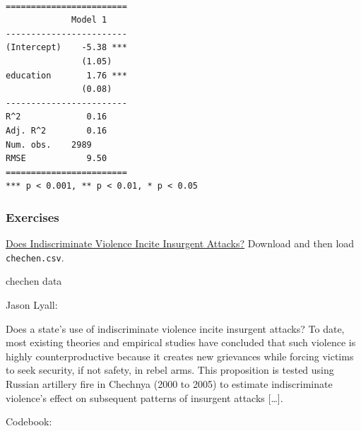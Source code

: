 \documentclass[]{article}
\theoremstyle{definition}
\theoremstyle{definition}
\theoremstyle{definition}
\theoremstyle{remark}
\begin{document}
\begin{verbatim}

========================
             Model 1    
------------------------
(Intercept)    -5.38 ***
               (1.05)   
education       1.76 ***
               (0.08)   
------------------------
R^2             0.16    
Adj. R^2        0.16    
Num. obs.    2989       
RMSE            9.50    
========================
*** p < 0.001, ** p < 0.01, * p < 0.05
\end{verbatim}

\subsubsection{Exercises}\label{exercises-8}

\href{http://journals.sagepub.com/doi/suppl/10.1177/0022002708330881}{Does
Indiscriminate Violence Incite Insurgent Attacks?} Download and then
load \texttt{chechen.csv}.

chechen data

Jason Lyall:

Does a state's use of indiscriminate violence incite insurgent attacks?
To date, most existing theories and empirical studies have concluded
that such violence is highly counterproductive because it creates new
grievances while forcing victims to seek security, if not safety, in
rebel arms. This proposition is tested using Russian artillery fire in
Chechnya (2000 to 2005) to estimate indiscriminate violence's effect on
subsequent patterns of insurgent attacks {[}\ldots{}{]}.

 Codebook:
\end{document}
